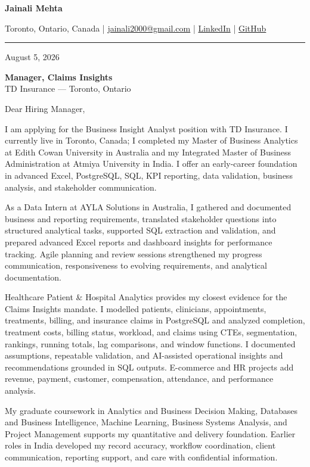 \documentclass[letterpaper,10pt]{article}
\begin{document}
\begin{center}
  {\fontsize{17}{19}\selectfont\textbf{Jainali Mehta}}\par\vspace{2pt}
  \small Toronto, Ontario, Canada \;|\;
  \href{mailto:jainali2000@gmail.com}{jainali2000@gmail.com} \;|\;
  \href{https://www.linkedin.com/in/jainali-mehta}{LinkedIn} \;|\;
  \href{https://github.com/jainalimehta}{GitHub}
\end{center}
\vspace{-5pt}
\noindent\rule{\textwidth}{0.4pt}

August 5, 2026

\textbf{Manager, Claims Insights}\\
TD Insurance --- Toronto, Ontario

Dear Hiring Manager,

I am applying for the Business Insight Analyst position with TD Insurance. I currently live in Toronto, Canada; I completed my Master of Business Analytics at Edith Cowan University in Australia and my Integrated Master of Business Administration at Atmiya University in India. I offer an early-career foundation in advanced Excel, PostgreSQL, SQL, KPI reporting, data validation, business analysis, and stakeholder communication.

As a Data Intern at AYLA Solutions in Australia, I gathered and documented business and reporting requirements, translated stakeholder questions into structured analytical tasks, supported SQL extraction and validation, and prepared advanced Excel reports and dashboard insights for performance tracking. Agile planning and review sessions strengthened my progress communication, responsiveness to evolving requirements, and analytical documentation.

Healthcare Patient \& Hospital Analytics provides my closest evidence for the Claims Insights mandate. I modelled patients, clinicians, appointments, treatments, billing, and insurance claims in PostgreSQL and analyzed completion, treatment costs, billing status, workload, and claims using CTEs, segmentation, rankings, running totals, lag comparisons, and window functions. I documented assumptions, repeatable validation, and AI-assisted operational insights and recommendations grounded in SQL outputs. E-commerce and HR projects add revenue, payment, customer, compensation, attendance, and performance analysis.

My graduate coursework in Analytics and Business Decision Making, Databases and Business Intelligence, Machine Learning, Business Systems Analysis, and Project Management supports my quantitative and delivery foundation. Earlier roles in India developed my record accuracy, workflow coordination, client communication, reporting support, and care with confidential information.
\end{document}
